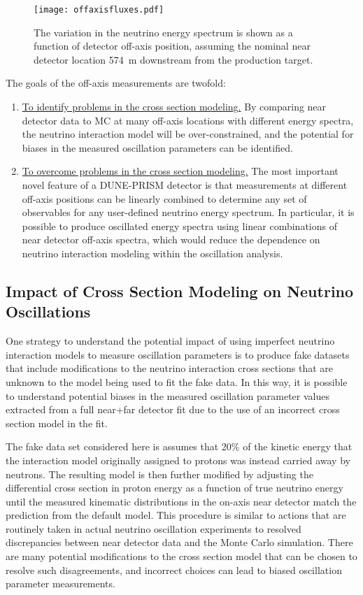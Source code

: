 \begin{figure}[h!]
   \begin{center}
      \texttt{[image: offaxisfluxes.pdf]}
      \caption{The variation in the neutrino energy spectrum is shown as a function of detector off-axis position, assuming the nominal near detector location 574~m downstream from the production target.}
      \label{fig:offaxisfluxes}
   \end{center}
\end{figure}


The goals of the off-axis measurements are twofold:
\begin{enumerate}
\item \underline{To identify problems in the cross section modeling.} By comparing near detector data to MC at many off-axis locations with different energy spectra, the neutrino interaction model will be over-constrained, and the potential for biases in the measured oscillation parameters can be identified.
\item \underline{To overcome problems in the cross section modeling.} The most important novel feature of a DUNE-PRISM detector is that measurements at different off-axis positions can be linearly combined to determine any set of observables for any user-defined neutrino energy spectrum. In particular, it is possible to produce oscillated energy spectra using linear combinations of near detector off-axis spectra, which would reduce the dependence on neutrino interaction modeling within the oscillation analysis.
\end{enumerate}

\subsection{Impact of Cross Section Modeling on Neutrino Oscillations}

One strategy to understand the potential impact of using imperfect neutrino interaction models to measure oscillation parameters is to produce fake datasets that include modifications to the neutrino interaction cross sections that are unknown to the model being used to fit the fake data. In this way, it is possible to understand potential biases in the measured oscillation parameter values extracted from a full near+far detector fit due to the use of an incorrect cross section model in the fit. 

The fake data set considered here is assumes that 20\% of the kinetic energy that the interaction model originally assigned to protons was instead carried away by neutrons. The resulting model is then further modified by adjusting the differential cross section in proton energy as a function of true neutrino energy until the measured kinematic distributions in the on-axis near detector match the prediction from the default model. This procedure is similar to actions that are routinely taken in actual neutrino oscillation experiments to resolved discrepancies between near detector data and the Monte Carlo simulation. There are many potential modifications to the cross section model that can be chosen to resolve such disagreements, and incorrect choices can lead to biased oscillation parameter measurements.



